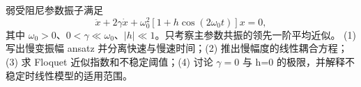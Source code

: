 弱受阻尼参数振子满足
\[
\ddot x+2\gamma\dot x+\omega_0^2[1+h\cos(2\omega_0t)]x=0,
\]
其中 \(\omega_0>0\)、\(0<\gamma\ll\omega_0\)、\(|h|\ll1\)。只考察主参数共振的领先一阶平均近似。
(1) 写出慢变振幅 ansatz 并分离快速与慢速时间；(2) 推出慢幅度的线性耦合方程；(3) 求 Floquet 近似指数和不稳定阈值；(4) 讨论 \(\gamma=0\) 与 h=0 的极限，并解释不稳定时线性模型的适用范围。

